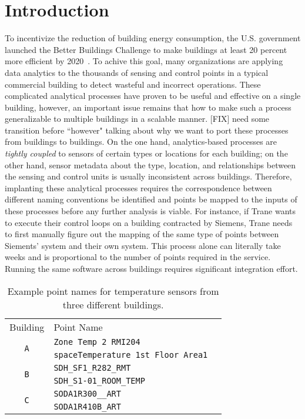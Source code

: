 \section{Introduction}

To incentivize the reduction of building energy consumption, the U.S. government 
launched the Better Buildings Challenge to make buildings at least 20 percent 
more efficient by 2020~\cite{doe2013better}. To achive this goal, many organizations 
are applying data analytics to the thousands of sensing and control points in 
a typical commercial building to detect wasteful and incorrect operations. These 
complicated analytical processes have proven to be useful and effective on 
a single building, however, an important issue remains that how to make such a process 
generalizable to multiple buildings in a scalable manner. [FIX] need some transition 
before ``however" talking about why we want to port these processes from buildings 
to buildings. On the one hand, analytics-based processes are \emph{tightly coupled} 
to sensors of certain types or locations for each building; on the other hand, 
sensor metadata about the type, location, and relationships between the sensing 
and control units is usually inconsistent across buildings. Therefore, implanting 
these analytical processes requires the correspondence between different naming 
conventions be identified and points be mapped to the inputs of these processes 
before any further analysis is viable. For instance, if Trane wants to execute their 
control loops on a building contracted by Siemens, Trane needs to first manually 
figure out the mapping of the same type of points between Siements' system and 
their own system. This process alone can literally take weeks and is proportional 
to the number of points required in the service. Running the same software across 
buildings requires significant integration effort.


\begin{table}[h]
\centering
\begin{tabular}{c|ll}
\cline{1-2}
Building & Point Name & \\
\cline{1-2}
\multirow{2}{*}{\texttt{A}}  & \texttt{Zone Temp 2 RMI204} &  \\
					& \texttt{spaceTemperature 1st Floor Area1} &  \\ \cline{1-2}
\multirow{2}{*}{\texttt{B}} & \texttt{SDH\_SF1\_R282\_RMT} &  \\
                     & \texttt{SDH\_S1-01\_ROOM\_TEMP} &  \\ \cline{1-2}
\multirow{2}{*}{\texttt{C}}  & \texttt{SODA1R300\_\_ART} &  \\
					  & \texttt{SODA1R410B\_ART} &  \\ \cline{1-2}
\end{tabular}
\caption{Example point names for temperature sensors from three different buildings.}
\label{table:ex}
\end{table}


